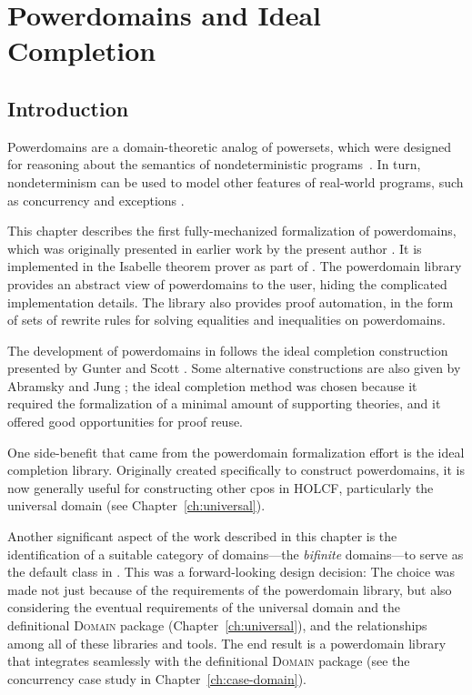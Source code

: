 \chapter{Powerdomains and Ideal Completion}
\label{ch:powerdomain}

\section{Introduction}

Powerdomains are a domain-theoretic analog of powersets, which were designed for reasoning about the semantics of nondeterministic programs~\cite{plotkin76powerdomain}. In turn, nondeterminism can be used to model other features of real-world programs, such as concurrency \cite{Papaspyrou01, thiemann95towards} and exceptions \cite{PJ++99}.

This chapter describes the first fully-mechanized formalization of powerdomains, which was originally presented in earlier work by the present author \cite{huffman08powerdomain}. It is implemented in the Isabelle theorem prover as part of . The powerdomain library provides an abstract view of powerdomains to the user, hiding the complicated implementation details. The library also provides proof automation, in the form of sets of rewrite rules for solving equalities and inequalities on powerdomains.

The development of powerdomains in  follows the ideal completion construction presented by Gunter and Scott \cite[\S5.2]{gunter90semantic}. Some alternative constructions are also given by Abramsky and Jung \cite[\S6.2]{abramsky94domain}; the ideal completion method was chosen because it required the formalization of a minimal amount of supporting theories, and it offered good opportunities for proof reuse.

One side-benefit that came from the powerdomain formalization effort is the  ideal completion library. Originally created specifically to construct powerdomains, it is now generally useful for constructing other cpos in HOLCF, particularly the universal domain (see Chapter~\ref{ch:universal}).

Another significant aspect of the work described in this chapter is the identification of a suitable category of domains---the \emph{bifinite} domains---to serve as the default class in . This was a forward-looking design decision: The choice was made not just because of the requirements of the powerdomain library, but also considering the eventual requirements of the universal domain and the definitional \textsc{Domain} package (Chapter~\ref{ch:universal}), and the relationships among all of these libraries and tools. The end result is a powerdomain library that integrates seamlessly with the definitional \textsc{Domain} package (see the concurrency case study in Chapter~\ref{ch:case-domain}).

